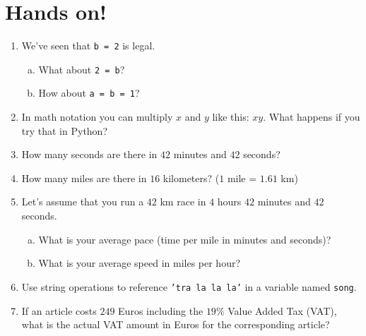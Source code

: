 \documentclass[aspectratio=1610,slidestop]{beamer}
\begin{document}
\section{Hands on!}
\begin{pframe}
 \vspace{-0.5cm}
 \begin{enumerate}
  \item We've seen that \texttt{b = 2} is legal.
  \begin{enumerate}[a.]
   \item What about \texttt{2 = b}?
   \item How about \texttt{a = b = 1}?
  \end{enumerate}
  \item In math notation you can multiply $x$ and $y$ like this: $xy$. What
  happens if you try that in Python?
  \item How many seconds are there in $42$ minutes and $42$ seconds?
  \item How many miles are there in $16$ kilometers? ($1$ mile = $1.61$ km)
  \item Let's assume that you run a $42$ km race in $4$ hours $42$ minutes and
  $42$ seconds.
  \begin{enumerate}[a.]
   \item What is your average pace (time per mile in minutes and seconds)?
   \item What is your average speed in miles per hour?
  \end{enumerate}
  \item Use string operations to reference \texttt{'tra la la la'}
  in a variable named \texttt{song}.
  \item If an article costs $249$ Euros including the $19\%$ Value Added Tax
  (VAT), what is the actual VAT amount in Euros for the corresponding article?
 \end{enumerate}
\end{pframe}


\end{document}
